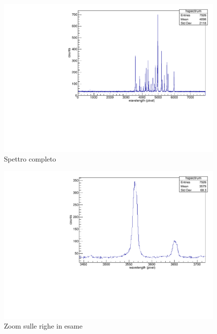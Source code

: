 \documentclass{article}
\begin{document}
	\begin{center}
		\begin{figure}[H]
			\centering
			\includegraphics[scale=0.38, angle=0]{spectrum.pdf}
			\setlength{\belowcaptionskip}{-20pt}
			\caption{Spettro completo}
			\label{fig:spectrum}
		\end{figure}
	\end{center}

	\begin{center}
		\begin{figure}[H]
			\centering
			\includegraphics[scale=0.38, angle=0]{zoomspectrum.pdf}
			\setlength{\belowcaptionskip}{-20pt}
			\caption{Zoom sulle righe in esame}
			\label{fig:spectrumzoom}
		\end{figure}
	\end{center}
\end{document}
